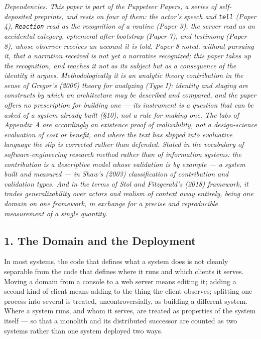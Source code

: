 \documentclass[
]{article}
\begin{document}
\emph{Dependencies. This paper is part of the Puppeteer Papers, a series
of self-deposited preprints, and rests on four of them: the actor's
speech and \texttt{tell} (Paper 4), \texttt{Reaction} read as the
recognition of a routine (Paper 3), the server read as an accidental
category, ephemeral after bootstrap (Paper 7), and testimony (Paper 8),
whose observer receives an account it is told. Paper 8 noted, without
pursuing it, that a narration received is not yet a narrative
recognized; this paper takes up the recognition, and reaches it not as
its subject but as a consequence of the identity it argues.
Methodologically it is an analytic theory contribution in the sense of
Gregor's (2006) theory for analyzing (Type I): identity and staging are
constructs by which an architecture may be described and compared, and
the paper offers no prescription for building one --- its instrument is
a question that can be asked of a system already built (§10), not a rule
for making one. The labs of Appendix A are accordingly an existence
proof of realizability, not a design-science evaluation of cost or
benefit, and where the text has slipped into evaluative language the
slip is corrected rather than defended. Stated in the vocabulary of
software-engineering research method rather than of information systems:
the contribution is a descriptive model whose validation is by example
--- a system built and measured --- in Shaw's (2003) classification of
contribution and validation types. And in the terms of Stol and
Fitzgerald's (2018) framework, it trades generalizability over actors
and realism of context away entirely, being one domain on one framework,
in exchange for a precise and reproducible measurement of a single
quantity.}

\subsection{1. The Domain and the
Deployment}\label{the-domain-and-the-deployment}

In most systems, the code that defines what a system does is not cleanly
separable from the code that defines where it runs and which clients it
serves. Moving a domain from a console to a web server means editing it;
adding a second kind of client means adding to the thing the client
observes; splitting one process into several is treated,
uncontroversially, as building a different system. Where a system runs,
and whom it serves, are treated as properties of the system itself ---
so that a monolith and its distributed successor are counted as two
systems rather than one system deployed two ways.
\end{document}

